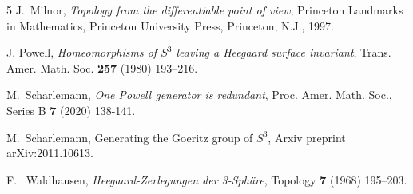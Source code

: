 \documentclass[12pt]{amsart}
\begin{document}
\begin{thebibliography}{5}
 J.~Milnor, {\em Topology from the differentiable point of view}, Princeton Landmarks in Mathematics, Princeton University Press, Princeton, N.J., 1997.


 J. Powell, {\em Homeomorphisms of $S^{3}$ leaving a Heegaard surface invariant}, Trans.  Amer.  Math.  Soc. {\bf 257} (1980) 193--216.


 M.~Scharlemann, {\em One Powell generator is redundant}, Proc. Amer. Math. Soc., Series B {\bf 7} (2020) 138-141. 

 M.~Scharlemann, Generating the Goeritz group of $S^3$, Arxiv preprint arXiv:2011.10613.

 F.~ Waldhausen, {\em Heegaard-Zerlegungen der 3-Sph\"are}, Topology {\bf 7} (1968) 195--203.


\end{thebibliography}
\end{document}
